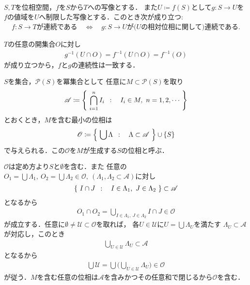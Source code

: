 	\begin{screen}
		\begin{thm}[部分空間と制限写像の連続性]
			$S,T$を位相空間，$f$を$S$から$T$への写像とする．
			また$U \coloneqq f(S)$として$g:S \longrightarrow U$を
			$f$の値域を$U$へ制限した写像とする．このとき次が成り立つ:
			\begin{align}
				\mbox{$f:S \longrightarrow T$が連続である} 
				\quad \Longleftrightarrow \quad
				\mbox{$g:S \longrightarrow U$が($U$の相対位相に関して)連続である}.
			\end{align}
		\end{thm}
	\end{screen}
	
	\begin{prf}
		$T$の任意の開集合$O$に対し
		\begin{align}
			g^{-1}(U \cap O) = f^{-1}(U \cap O) = f^{-1}(O)
		\end{align}
		が成り立つから，$f$と$g$の連続性は一致する．
		\QED
	\end{prf}
	
	\begin{screen}
		\begin{thm}[位相の生成]
			$S$を集合，$\mathcal{P}(S)$を冪集合として
			任意に$M \subset \mathcal{P}(S)$を取り
			\begin{align}
				\mathscr{A} \coloneqq
				\left\{\ \bigcap_{i=1}^n I_i\ \, : \quad I_i \in M,\ n = 1,2,\cdots\ \right\}
			\end{align}
			とおくとき，$M$を含む最小の位相は
			\begin{align}
				\mathscr{O} \coloneqq
				\left\{\ \bigcup \Lambda\ \, : \quad \Lambda \subset \mathscr{A}\ \right\}
				\cup \{S\}
			\end{align}
			で与えられる．この$\mathscr{O}$を$M$が生成する$S$の位相と呼ぶ．
		\end{thm}
	\end{screen}
	
	\begin{prf}
		$\mathscr{O}$は定め方より$S$と$\emptyset$を含む．また
		任意の$O_1 = \bigcup \Lambda_1,\ O_2=\bigcup \Lambda_2 \in \mathscr{O},\ 
		(\Lambda_1,\Lambda_2 \subset \mathscr{A})$に対し
		\begin{align}
			\left\{\ I \cap J\ \, : \quad I \in \Lambda_1,\ J \in \Lambda_2\ \right\} \subset \mathscr{A}
		\end{align}
		となるから
		\begin{align}
			O_1 \cap O_2 = \bigcup_{I \in \Lambda_1,\ J \in \Lambda_2} I \cap J \in \mathscr{O}
		\end{align}
		が成立する．任意に$\emptyset \neq \mathscr{U} \subset \mathscr{O}$を取れば，
		各$U \in \mathscr{U}$に$U = \bigcup \Lambda_U$を満たす
		$\Lambda_U \subset \mathscr{A}$が対応し，このとき
		\begin{align}
			\bigcup_{U \in \mathscr{U}} \Lambda_U \subset \mathscr{A}
		\end{align}
		となるから
		\begin{align}
			\bigcup \mathscr{U} = \bigcup \Biggl(\bigcup_{U \in \mathscr{U}} \Lambda_U\Biggr)
			\in \mathscr{O}
		\end{align}
		が従う．$M$を含む任意の位相は$\mathscr{A}$を含みかつその任意和で閉じるから$\mathscr{O}$を含む．
		\QED
	\end{prf}
	
